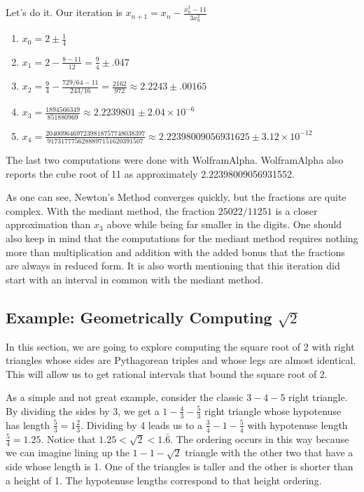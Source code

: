 \documentclass[12pt]{article}
\theoremstyle{remark}
\begin{document}
Let's do it. Our iteration is $x_{n+1} = x_n - \frac{x_n^3 -11}{3 x_n^2}$ 
\begin{enumerate}
\item $x_0 = 2 \pm \frac{1}{4}$
\item $x_1 = 2 - \frac{8- 11}{12} = \frac{9}{4} \pm .047$
\item $x_2 = \frac{9}{4} - \frac{ 729/64 - 11 }{243/16} = \frac{2162}{972}\approx 2.2243 \pm .00165$
\item $x_3 = \frac{1894566349}{851880969} \approx 2.2239801 \pm 2.04\times 10^{-6}$
\item $x_4 = \frac{20400964697239818757748038397}{9173177756288897151620391507} \approx 2.22398009056931625 \pm 3.12 \times 10^{-12}$
\end{enumerate}


The last two computations were done with WolframAlpha.  WolframAlpha also reports the cube root of 11 as approximately 2.22398009056931552. 

As one can see, Newton's Method converges quickly, but the fractions are quite complex. With the mediant method, the fraction $25022/11251$ is a closer approximation than $x_3$ above while being far smaller in the digits. One should also keep in mind that the computations for the mediant method requires nothing more than multiplication and addition with the added bonus that the fractions are always in reduced form. It is also worth mentioning that this iteration did start with an interval in common with the mediant method. 

\subsection{Example: Geometrically Computing $\sqrt{2}$}

In this section, we are going to explore computing the square root of 2 with right triangles whose sides are Pythagorean triples and whose legs are almost identical. This will allow us to get rational intervals that bound the square root of 2. 

As a simple and not great example, consider the classic $3-4-5$ right triangle. By dividing the sides by 3, we get a $1-\frac{4}{3}-\frac{5}{3}$ right triangle whose hypotenuse has length $\frac{5}{3} = 1 \frac{2}{3}$. Dividing by 4 leads us to a $\frac{3}{4}-1-\frac{5}{4}$ with hypotenuse  length $\frac{5}{4} = 1.25$. Notice that $1.25 < \sqrt{2} < 1.\bar{6}$.  The ordering occurs in this way because we can imagine lining up the $1-1-\sqrt{2}$ triangle with the other two that have a side whose length is 1. One of the triangles is taller and the other is shorter than a height of 1. The hypotenuse lengths correspond to that height ordering. 
\end{document}
